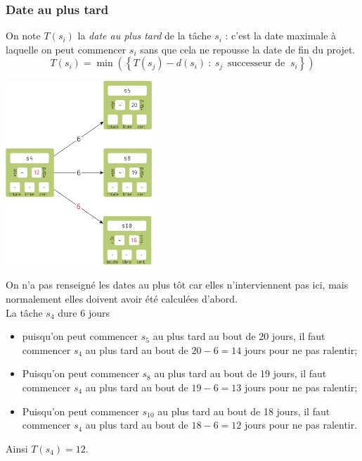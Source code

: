 \subsubsection*{Date au plus tard}

\begin{definition}
    On note $T(s_i)$ la \textit{date au plus tard} de la tâche $s_i$ : c'est la date maximale à laquelle on peut commencer $s_i$ sans que cela ne repousse la date de fin du projet.
    $$T(s_i)=\min\left(\left\{T(s_j)-d(s_i)\::\:s_j\,\text{ successeur de }\:s_i\right\}\right)$$
\end{definition}
\begin{exemple}[]
    \begin{center}
        \includegraphics[width=5.5cm]{graphes2/img/mpm_au_plus_tard.png}
    \end{center}
    On n'a pas renseigné les dates au plus tôt car elles n'interviennent pas ici, mais normalement elles doivent avoir été calculées d'abord.\\
    La tâche $s_4$ dure 6 jours
    \begin{itemize}
        \item 	puisqu'on peut commencer $s_5$ au plus tard au bout de 20 jours, il faut commencer $s_4$ au plus tard au bout de $20-6=14$ jours pour ne pas ralentir;
        \item 	Puisqu'on peut commencer $s_8$ au plus tard au bout de 19 jours, il faut commencer $s_4$ au plus tard au bout de $19-6=13$ jours pour ne pas ralentir;
        \item 	Puisqu'on peut commencer $s_{10}$ au plus tard au bout de 18 jours, il faut commencer $s_4$ au plus tard au bout de $18-6=12$ jours pour ne pas ralentir.
    \end{itemize}
    Ainsi $T(s_4)=12$.
\end{exemple}
